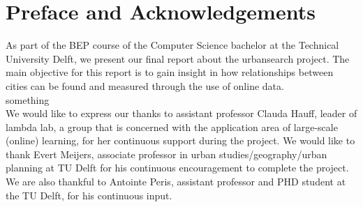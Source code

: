 \chapter*{Preface and Acknowledgements}
As part of the BEP course of the Computer Science bachelor at the Technical University Delft, we present our final report about the urbansearch project. The main objective for this report is to gain insight in how relationships between cities can be found and measured through the use of online data.\\

something \\

We would like to express our thanks to assistant professor Clauda Hauff, leader of lambda lab, a group that is concerned with the application area of large-scale (online) learning, for her continuous support during the project. We would like to thank Evert Meijers, associate professor in urban studies/geography/urban planning at TU Delft for his continuous encouragement to complete the project. We are also thankful to Antointe Peris, assistant professor and PHD student at the TU Delft, for his continuous input.